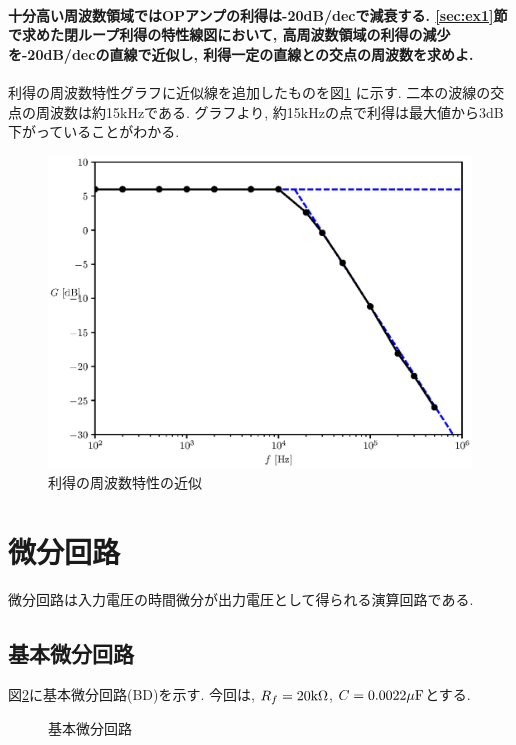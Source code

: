 \documentclass[titlepage]{jsarticle}
\begin{document}
        \paragraph{
            十分高い周波数領域ではOPアンプの利得は-20dB/decで減衰する.
            \ref{sec:ex1}節で求めた閉ループ利得の特性線図において,
            高周波数領域の利得の減少を-20dB/decの直線で近似し,
            利得一定の直線との交点の周波数を求めよ. \\
        }

            利得の周波数特性グラフに近似線を追加したものを図\ref{fig:inv-amp-ex}
            に示す.
            二本の波線の交点の周波数は約15kHzである.
            グラフより,
            約15kHzの点で利得は最大値から3dB下がっていることがわかる.

            \begin{figure}[h]
                \centering
                \includegraphics[width=0.8\hsize]{img/inv-amp-ex-graph.eps}
                \caption{利得の周波数特性の近似}
                \label{fig:inv-amp-ex}
            \end{figure}

\section{微分回路}
    微分回路は入力電圧の時間微分が出力電圧として得られる演算回路である.
    
    \subsection{基本微分回路}
        図\ref{fig:dif}に基本微分回路(BD)を示す.
        今回は, $R_f = 20\rm{k\Omega}$, $C = 0.0022\rm{\mu F}$とする.

        \begin{figure}[h]
            \centering
            \caption{基本微分回路}
            \label{fig:dif}
        \end{figure}
\end{document}
